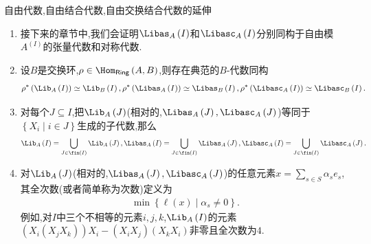 \begin{remark}{自由代数,自由结合代数,自由交换结合代数的延伸}{}
\begin{enumerate}
	\item 接下来的章节中,我们会证明$\Libas_{A}\left(I\right)$和$\Libasc_{A}\left(I\right)$分别同构于自由模$A^{\left(I\right)}$的张量代数和对称代数.
	\item 设$B$是交换环,$\rho\in\Hom_{\mathsf{Ring}}\left(A,B\right)$,则存在典范的$B$-代数同构
	\begin{align*}
		\rho^{\ast}\left(\Lib_{A}\left(I\right)\right)\simeq\Lib_{B}\left(I\right),\rho^{\ast}\left(\Libas_{A}\left(I\right)\right)\simeq\Libas_{B}\left(I\right),\rho^{\ast}\left(\Libasc_{A}\left(I\right)\right)\simeq\Libasc_{B}\left(I\right).
	\end{align*}
	\item 对每个$J\subseteq I$,把$\Lib_{A}\left(J\right)$(相对的,$\Libas_{A}\left(J\right),\Libasc_{A}\left(J\right)$)等同于$\left\{X_{i}\middle|i\in J\right\}$生成的子代数,那么
	\begin{align*}
		\Lib_{A}\left(I\right)=\bigcup\limits_{J\in\fin\left(I\right)}\Lib_{A}\left(J\right),\Libas_{A}\left(I\right)=\bigcup\limits_{J\in\fin\left(I\right)}\Libas_{A}\left(J\right),\Libasc_{A}\left(I\right)=\bigcup\limits_{J\in\fin\left(I\right)}\Libasc_{A}\left(J\right).
	\end{align*}
	\item 对$\Lib_{A}\left(J\right)$(相对的,$\Libas_{A}\left(J\right),\Libasc_{A}\left(J\right)$)的任意元素$x=\sum\limits_{s\in S}\alpha_{s}e_{s}$,其全次数(或者简单称为次数)定义为
	\begin{align*}
		\min\left\{\ell\left(x\right)\middle|\alpha_{s}\neq 0\right\}.
	\end{align*}
	例如,对$I$中三个不相等的元素$i,j,k$,$\Lib_{A}\left(I\right)$的元素$\left(X_{i}\left(X_{j}X_{k}\right)\right)X_{i}-\left(X_{i}X_{j}\right)\left(X_{k}X_{i}\right)$非零且全次数为$4$.
\end{enumerate}
\end{remark}










































































